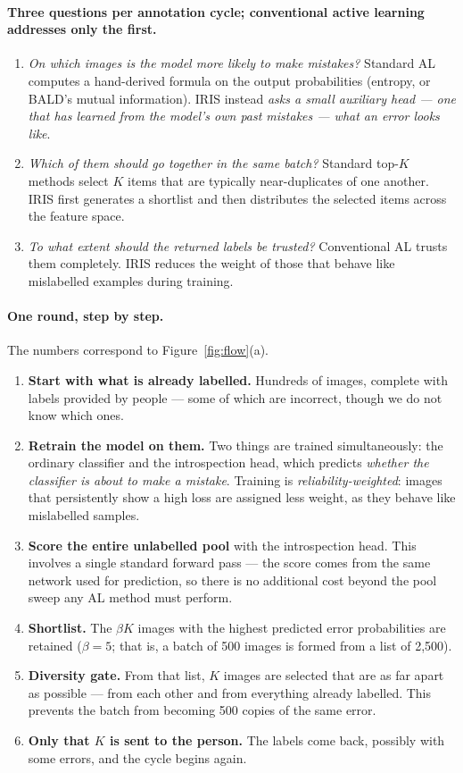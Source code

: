 \documentclass[a4paper,fleqn,longmktitle]{cas-sc}
\newcommand{\method}{IRIS}
\begin{document}
\paragraph{Three questions per annotation cycle; conventional active
learning addresses only the first.}
\begin{enumerate}
  \item \emph{On which images is the model more likely to make
  mistakes?} Standard AL computes a hand-derived formula on the output
  probabilities (entropy, or BALD's mutual information). \method{}
  instead \emph{asks a small auxiliary head --- one that has learned
  from the model's own past mistakes --- what an error looks like}.
  \item \emph{Which of them should go together in the same batch?}
  Standard top-$K$ methods select $K$ items that are typically
  near-duplicates of one another. \method{} first generates a shortlist
  and then distributes the selected items across the feature space.
  \item \emph{To what extent should the returned labels be trusted?}
  Conventional AL trusts them completely. \method{} reduces the weight
  of those that behave like mislabelled examples during training.
\end{enumerate}

\paragraph{One round, step by step.} The numbers correspond to
Figure~\ref{fig:flow}(a).
\begin{enumerate}
  \item \textbf{Start with what is already labelled.} Hundreds of
  images, complete with labels provided by people --- some of which are
  incorrect, though we do not know which ones.
  \item \textbf{Retrain the model on them.} Two things are trained
  simultaneously: the ordinary classifier and the introspection head,
  which predicts \emph{whether the classifier is about to make a
  mistake}. Training is \emph{reliability-weighted}: images that
  persistently show a high loss are assigned less weight, as they
  behave like mislabelled samples.
  \item \textbf{Score the entire unlabelled pool} with the
  introspection head. This involves a single standard forward pass ---
  the score comes from the same network used for prediction, so there
  is no additional cost beyond the pool sweep any AL method must
  perform.
  \item \textbf{Shortlist.} The $\beta K$ images with the highest
  predicted error probabilities are retained ($\beta=5$; that is, a
  batch of 500 images is formed from a list of 2,500).
  \item \textbf{Diversity gate.} From that list, $K$ images are
  selected that are as far apart as possible --- from each other and
  from everything already labelled. This prevents the batch from
  becoming 500 copies of the same error.
  \item \textbf{Only that $K$ is sent to the person.} The labels come
  back, possibly with some errors, and the cycle begins again.
\end{enumerate}
\end{document}
